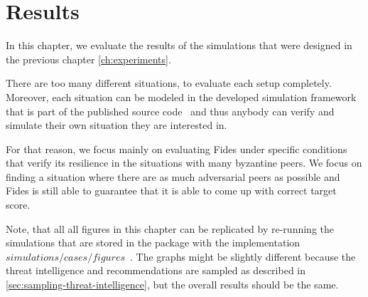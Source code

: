 \chapter{Results}
\label{ch:results}

In this chapter, we evaluate the results of the simulations that were designed in the previous chapter \ref{ch:experiments}.

There are too many different situations, to evaluate each setup completely. Moreover, each situation can be modeled in the developed simulation framework that is part of the published source code~\cite{fidesGithub} and thus anybody can verify and simulate their own situation they are interested in.

For that reason, we focus mainly on evaluating Fides under specific conditions that verify its resilience in the situations with many byzantine peers.
We focus on finding a situation where there are as much adversarial peers as possible and Fides is still able to guarantee that it is able to come up with correct target score.

Note, that all all figures in this chapter can be replicated by re-running the simulations that are stored in the package with the implementation $simulations/cases/figures$~\cite{fidesGithub}.
The graphs might be slightly different because the threat intelligence and recommendations are sampled as described in \ref{sec:sampling-threat-intelligence}, but the overall results should be the same.





